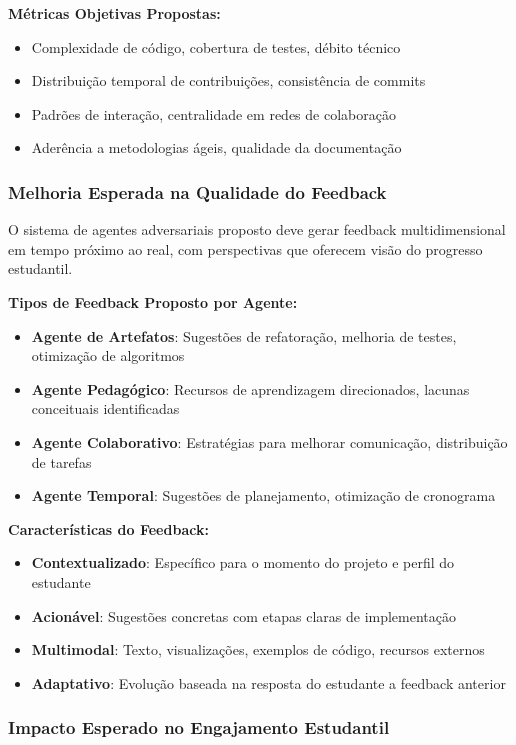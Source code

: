 \documentclass[english, spanish, brazilian]{modelo_dt}
\begin{document}
\textbf{Métricas Objetivas Propostas:}
\begin{itemize}
\item Complexidade de código, cobertura de testes, débito técnico
\item Distribuição temporal de contribuições, consistência de commits
\item Padrões de interação, centralidade em redes de colaboração
\item Aderência a metodologias ágeis, qualidade da documentação
\end{itemize}

\subsubsection{Melhoria Esperada na Qualidade do Feedback}

O sistema de agentes adversariais proposto deve gerar feedback multidimensional em tempo próximo ao real, com perspectivas que oferecem visão do progresso estudantil.

\textbf{Tipos de Feedback Proposto por Agente:}
\begin{itemize}
\item \textbf{Agente de Artefatos}: Sugestões de refatoração, melhoria de testes, otimização de algoritmos
\item \textbf{Agente Pedagógico}: Recursos de aprendizagem direcionados, lacunas conceituais identificadas
\item \textbf{Agente Colaborativo}: Estratégias para melhorar comunicação, distribuição de tarefas
\item \textbf{Agente Temporal}: Sugestões de planejamento, otimização de cronograma
\end{itemize}

\textbf{Características do Feedback:}
\begin{itemize}
\item \textbf{Contextualizado}: Específico para o momento do projeto e perfil do estudante
\item \textbf{Acionável}: Sugestões concretas com etapas claras de implementação
\item \textbf{Multimodal}: Texto, visualizações, exemplos de código, recursos externos
\item \textbf{Adaptativo}: Evolução baseada na resposta do estudante a feedback anterior
\end{itemize}

\subsubsection{Impacto Esperado no Engajamento Estudantil}
\end{document}
